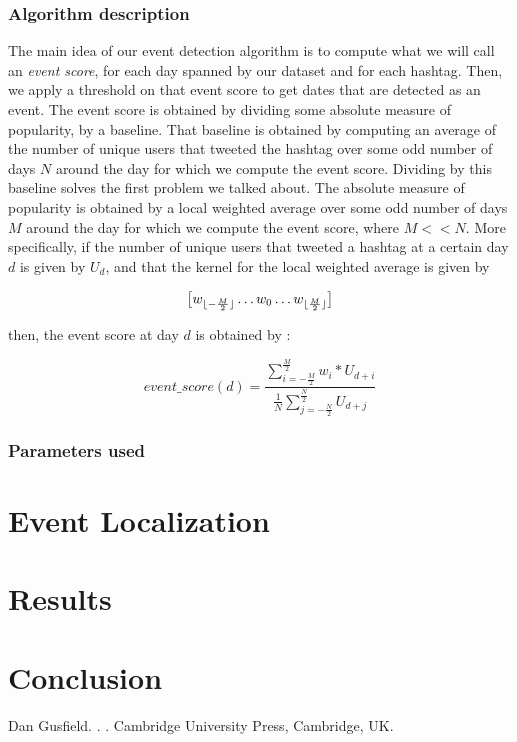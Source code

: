 \documentclass[11pt]{article}
\DeclarePairedDelimiter\floor{\lfloor}{\rfloor}
\begin{document}
\subsubsection{Algorithm description}
The main idea of our event detection algorithm is to compute what we will call an \textit{event score}, for each day spanned by our dataset and for each hashtag. Then, we apply a threshold on that event score to get dates that are detected as an event.
The event score is obtained by dividing some absolute measure of popularity, by a baseline. That baseline is obtained by computing an average of the number of unique users that tweeted the hashtag over some odd number of days $N$ around the day for which we compute the event score. Dividing by this baseline solves the first problem we talked about. The absolute measure of popularity is obtained by a local weighted average over some odd number of days $M$ around the day for which we compute the event score, where $M << N$. 
More specifically, if the number of unique users that tweeted a hashtag at a certain day $d$ is given by $U_d$, and that the kernel for the local weighted average is given by 

$$ \big[ w_{ \floor{ -\frac{M}{2} } }  \dots w_{0}  \dots  w_{ \floor{ \frac{M}{2} } } \big] $$

then, the event score at day $d$ is obtained by :

$$ 
event\_score(d) =  \frac {\sum_{i=-\frac{M}{2}}^{\frac{M}{2}} w_i * U_{d + i} }
				    {\frac{1}{N} \sum_{j=-\frac{N}{2}}^{\frac{N}{2}}  U_{d + j} }
$$

\subsubsection{Parameters used}


\section{Event Localization}

\section{Results}

\section{Conclusion}

\begin{thebibliography}{}

Dan Gusfield.
.
.
\newblock Cambridge University Press, Cambridge, UK.

\end{thebibliography}
\end{document}
